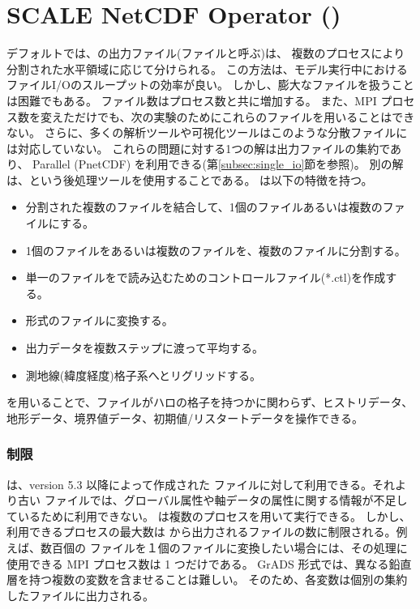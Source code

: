 \section{SCALE NetCDF Operator (\sno)} \label{sec:snoutil}

デフォルトでは、\scalerm の出力ファイル(\scalenetcdf ファイルと呼ぶ)は、
複数のプロセスにより分割された水平領域に応じて分けられる。
この方法は、モデル実行中におけるファイルI/Oのスループットの効率が良い。
しかし、膨大なファイルを扱うことは困難でもある。
ファイル数はプロセス数と共に増加する。
また、MPI プロセス数を変えただけでも、次の実験のためにこれらのファイルを用いることはできない。
さらに、多くの解析ツールや可視化ツールはこのような分散ファイルには対応していない。
これらの問題に対する1つの解は出力ファイルの集約であり、
Parallel \netcdf (PnetCDF) を利用できる(第\ref{subsec:single_io}節を参照)。
別の解は、\sno という後処理ツールを使用することである。
\sno は以下の特徴を持つ。

\begin{itemize}
 \item 分割された複数のファイルを結合して、1個のファイルあるいは複数のファイルにする。
 \item 1個のファイルをあるいは複数のファイルを、複数のファイルに分割する。
 \item 単一の{\Netcdf}ファイルを{\grads}で読み込むためのコントロールファイル(*.ctl)を作成する。
 \item \grads 形式のファイルに変換する。
 \item 出力データを複数ステップに渡って平均する。
 \item 測地線(緯度経度)格子系へとリグリッドする。
\end{itemize}

\sno を用いることで、ファイルがハロの格子を持つかに関わらず、ヒストリデータ、地形データ、境界値データ、初期値/リスタートデータを操作できる。

\subsubsection{制限}

\sno は、\scalelib version 5.3 以降によって作成された \scalenetcdf ファイルに対して利用できる。それより古い \scalenetcdf ファイルでは、グローバル属性や軸データの属性に関する情報が不足しているために利用できない。
\sno は複数のプロセスを用いて実行できる。
しかし、利用できるプロセスの最大数は \sno から出力されるファイルの数に制限される。例えば、数百個の \scalenetcdf ファイルを１個のファイルに変換したい場合には、その処理に使用できる MPI プロセス数は 1 つだけである。
GrADS 形式では、異なる鉛直層を持つ複数の変数を含ませることは難しい。
そのため、各変数は個別の集約したファイルに出力される。

